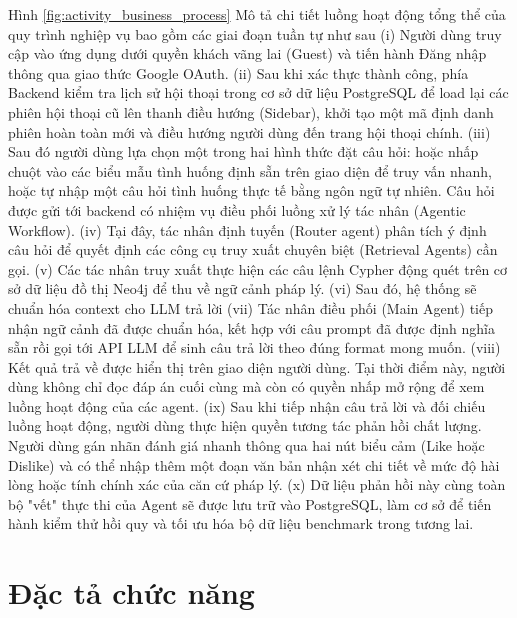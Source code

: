 \documentclass[../DoAn.tex]{subfiles}
\begin{document}
Hình \ref{fig:activity_business_process} Mô tả chi tiết luồng hoạt động tổng thể của quy trình nghiệp vụ bao gồm các giai đoạn tuần tự như sau (i) Người dùng truy cập vào ứng dụng dưới quyền khách vãng lai (Guest) và tiến hành Đăng nhập thông qua giao thức Google OAuth. (ii) Sau khi xác thực thành công, phía Backend kiểm tra lịch sử hội thoại trong cơ sở dữ liệu PostgreSQL để load lại các phiên hội thoại cũ lên thanh điều hướng (Sidebar),  khởi tạo một mã định danh phiên hoàn toàn mới và điều hướng người dùng đến trang hội thoại chính. (iii) Sau đó người dùng lựa chọn một trong hai hình thức đặt câu hỏi: hoặc nhấp chuột vào các biểu mẫu tình huống định sẵn trên giao diện để truy vấn nhanh, hoặc tự nhập một câu hỏi tình huống thực tế bằng ngôn ngữ tự nhiên. Câu hỏi được gửi tới backend có nhiệm vụ điều phối luồng xử lý tác nhân (Agentic Workflow). (iv) Tại đây, tác nhân định tuyến (Router agent) phân tích ý định câu hỏi để quyết định các công cụ truy xuất chuyên biệt (Retrieval Agents) cần gọi. (v) Các tác nhân truy xuất thực hiện các câu lệnh Cypher động quét trên cơ sở dữ liệu đồ thị Neo4j để thu về ngữ cảnh pháp lý. (vi) Sau đó, hệ thống sẽ chuẩn hóa context cho LLM trả lời (vii) Tác nhân điều phối (Main Agent) tiếp nhận ngữ cảnh đã được chuẩn hóa, kết hợp với câu prompt đã được định nghĩa sẵn rồi gọi tới API LLM để sinh câu trả lời theo đúng format mong muốn. (viii) Kết quả trả về được hiển thị trên giao diện người dùng. Tại thời điểm này, người dùng không chỉ đọc đáp án cuối cùng mà còn có quyền nhấp mở rộng để xem luồng hoạt động của các agent. (ix) Sau khi tiếp nhận câu trả lời và đối chiếu luồng hoạt động, người dùng thực hiện quyền tương tác phản hồi chất lượng. Người dùng gán nhãn đánh giá nhanh thông qua hai nút biểu cảm (Like hoặc Dislike) và có thể nhập thêm một đoạn văn bản nhận xét chi tiết về mức độ hài lòng hoặc tính chính xác của căn cứ pháp lý. (x) Dữ liệu phản hồi này cùng toàn bộ "vết" thực thi của Agent sẽ được lưu trữ vào PostgreSQL, làm cơ sở để tiến hành kiểm thử hồi quy và tối ưu hóa bộ dữ liệu benchmark trong tương lai.

\section{Đặc tả chức năng}
\end{document}
